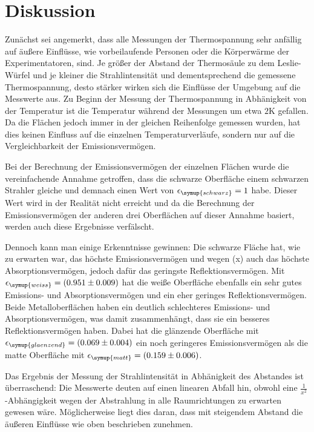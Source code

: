 \section{Diskussion}
\label{sec:Diskussion}
Zunächst sei angemerkt, dass alle Messungen der Thermospannung sehr anfällig auf
äußere Einflüsse, wie vorbeilaufende Personen oder die Körperwärme der Experimentatoren,
sind. Je größer der Abstand der Thermosäule zu dem Leslie-Würfel und je kleiner
die Strahlintensität und dementsprechend die gemessene Thermospannung, desto stärker
wirken sich die Einflüsse der Umgebung auf die Messwerte aus.
Zu Beginn der Messung der Thermospannung in Abhänigkeit von der Temperatur ist
die Temperatur während der Messungen um etwa $2 \si{\kelvin}$ gefallen. Da die Flächen
jedoch immer in der gleichen Reihenfolge gemessen wurden, hat dies keinen Einfluss
auf die einzelnen Temperaturverläufe, sondern nur auf die Vergleichbarkeit der
Emissionsvermögen.

Bei der Berechnung der Emissionsvermögen der einzelnen Flächen wurde die vereinfachende
Annahme getroffen, dass die schwarze Oberfläche einem schwarzen Strahler gleiche
und demnach einen Wert von $\epsilon_\symup{schwarz} = 1$ habe. Dieser Wert wird
in der Realität nicht erreicht und da die Berechnung der Emissionsvermögen der
anderen drei Oberflächen auf dieser Annahme basiert, werden auch diese Ergebnisse
verfälscht.

Dennoch kann man einige Erkenntnisse gewinnen:\newline
Die schwarze Fläche hat, wie zu erwarten war, das höchste Emissionsvermögen und
wegen (x) auch das höchste Absorptionsvermögen, jedoch dafür das geringste
Reflektionsvermögen.
Mit $\epsilon_\symup{weiss} = (0.951\pm0.009)$ hat die weiße Oberfläche ebenfalls
ein sehr gutes Emissions- und Absorptionsvermögen und ein eher geringes Reflektionsvermögen.
Beide Metalloberflächen haben ein deutlich schlechteres Emissions- und Absorptionsvermögen,
was damit zusammenhängt, dass sie ein besseres Reflektionsvermögen haben.
Dabei hat die glänzende Oberfläche mit $\epsilon_\symup{glaenzend} = (0.069\pm0.004)$
ein noch geringeres Emissionsvermögen als die matte Oberfläche mit
$\epsilon_\symup{matt} = (0.159\pm0.006)$.

Das Ergebnis der Messung der Strahlintensität in Abhänigkeit des Abstandes ist
überraschend: Die Messwerte deuten auf einen linearen Abfall hin, obwohl eine
$\frac{1}{x^2}$-Abhängigkeit wegen der Abstrahlung in alle Raumrichtungen zu
erwarten gewesen wäre. Möglicherweise liegt dies daran, dass mit steigendem Abstand
die äußeren Einflüsse wie oben beschrieben zunehmen.
